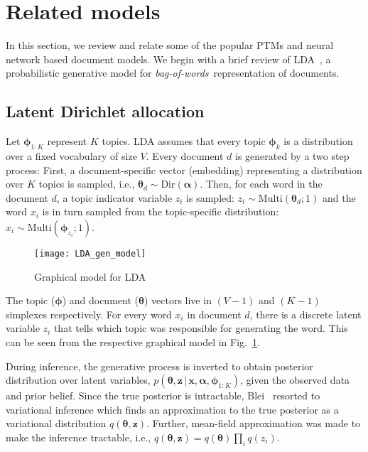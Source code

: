 \documentclass[journal]{IEEEtran}
\newcommand{\mb}[1]{\bm{#1}}
\newcommand{\bs}[1]{\bm{#1}}
\newcommand{\bow}{\textit{bag-of-words}}
\begin{document}
\section{Related models}
\label{sec:related_models}
In this section, we review and relate some of the popular PTMs and neural network based document models. We begin with a brief review of LDA~\cite{Blei:2003:LDA}, a probabilistic generative model for \bow~representation of documents.

\subsection{Latent Dirichlet allocation}
Let \(\bs{\phi}_{1:K}\) represent \(K\) topics. LDA assumes that every topic 
\(\bs{\phi}_k\) is a distribution over a fixed vocabulary of size \(V\). Every
document \(d\) is generated by a two step process:
First, a document-specific vector (embedding) representing a distribution over 
\(K\) topics is sampled, i.e., \(\bs{\theta}_d \sim 
\mathrm{Dir}(\bs{\alpha})\). 
Then, for each word in the document \(d\), a topic indicator variable
\(z_{i}\) is sampled: \(z_i \sim \mathrm{Multi}(\bs{\theta}_d; 1)\) and the 
word \(x_{i}\) is in turn sampled from the topic-specific distribution: \(x_{i} 
\sim \mathrm{Multi}(\bs{\phi}_{z_{i}}; 1)\).

\begin{figure}[t!]
	\centering
	\texttt{[image: LDA\_gen\_model]}
	\caption{Graphical model for LDA} \label{fig:lda}
\end{figure}
The topic (\(\bs{\phi}\)) and document (\(\bs{\theta}\)) vectors live in \((V-1)\) and \((K-1)\) simplexes respectively. For every word \(x_{i}\) in document \(d\), there is a discrete latent variable \(z_{i}\) that tells which topic was responsible for generating the word. This can be seen from the respective graphical model in Fig.~\ref{fig:lda}.


During inference, the generative process is inverted to obtain posterior 
distribution over latent variables, \(p(\bs{\theta},\mb{z}\,|\, 
\mb{x},\bs{\alpha}, \bs{\phi}_{1:K})\), given the observed data and prior 
belief.
Since the true posterior is intractable, Blei~\cite{Blei:2003:LDA} resorted to 
variational inference which finds an approximation to the true posterior as a 
variational distribution \(q(\bs{\theta}, \mb{z})\). Further, mean-field 
approximation was made to make the inference tractable, i.e., \(q(\bs{\theta}, 
\mb{z}) = q(\bs{\theta})\prod_{i}q(z_i)\).
\end{document}
